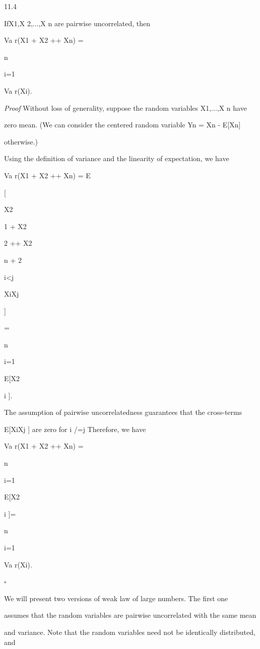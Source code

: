 \begin{thmbox}{11.4}
\end{thmbox}

IfX1,X 2,...,X n are pairwise uncorrelated, then

Va r(X1 + X2 +\cdot\cdot\cdot+ Xn) =

n\sum

i=1

Va r(Xi).

\textit{Proof} Without loss of generality, suppose the random variables X1,...,X n have

zero mean. (We can consider the centered random variable Yn = Xn - E[Xn]

otherwise.)

Using the definition of variance and the linearity of expectation, we have

Va r(X1 + X2 +\cdot\cdot\cdot+ Xn) = E

[

X2

1 + X2

2 +\cdot\cdot\cdot+ X2

n + 2

\sum

i<j

XiXj

]

=

n\sum

i=1

E[X2

i ].

The assumption of pairwise uncorrelatedness guarantees that the cross-terms

E[XiXj ] are zero for i /=j Therefore, we have

Va r(X1 + X2 +\cdot\cdot\cdot+ Xn) =

n\sum

i=1

E[X2

i ]=

n\sum

i=1

Va r(Xi).

\hfill $\square$

We will present two versions of weak law of large numbers. The first one

assumes that the random variables are pairwise uncorrelated with the same mean

and variance. Note that the random variables need not be identically distributed, and

